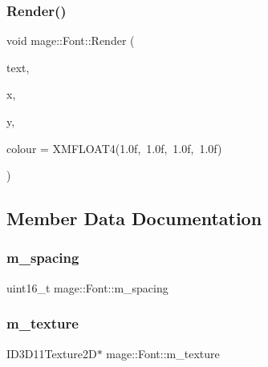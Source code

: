 \hypertarget{classmage_1_1_font_a1be5ae8a4da06d84081fde478df7fd0e}{}\label{classmage_1_1_font_a1be5ae8a4da06d84081fde478df7fd0e} 
\subsubsection{\texorpdfstring{Render()}{Render()}}
{\footnotesize\ttfamily void mage\+::\+Font\+::\+Render (\begin{DoxyParamCaption}\item[{char $\ast$}]{text,  }\item[{float}]{x,  }\item[{float}]{y,  }\item[{X\+M\+F\+L\+O\+A\+T4}]{colour = {\ttfamily XMFLOAT4(1.0f,~1.0f,~1.0f,~1.0f)} }\end{DoxyParamCaption})}



\subsection{Member Data Documentation}
\hypertarget{classmage_1_1_font_adf5b07b3d91d4dc84e92c3e997ec3d13}{}\label{classmage_1_1_font_adf5b07b3d91d4dc84e92c3e997ec3d13} 
\subsubsection{\texorpdfstring{m\+\_\+spacing}{m\_spacing}}
{\footnotesize\ttfamily uint16\+\_\+t mage\+::\+Font\+::m\+\_\+spacing\hspace{0.3cm}{\ttfamily [protected]}}

\hypertarget{classmage_1_1_font_a4ccec8d9d3e29b3ef307b8111084c9b8}{}\label{classmage_1_1_font_a4ccec8d9d3e29b3ef307b8111084c9b8} 
\subsubsection{\texorpdfstring{m\+\_\+texture}{m\_texture}}
{\footnotesize\ttfamily I\+D3\+D11\+Texture2D$\ast$ mage\+::\+Font\+::m\+\_\+texture\hspace{0.3cm}{\ttfamily [protected]}}

